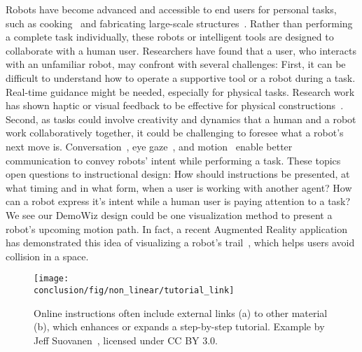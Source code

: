 Robots have become advanced and accessible to end users for personal tasks, such as cooking~\cite{Cha:2015:RHQ:2696454.2696465} and fabricating large-scale structures~\cite{Vasey:2016:HHR:2897839.2927404}. Rather than performing a complete task individually, these robots or intelligent tools are designed to collaborate with a human user. Researchers have found that a user, who interacts with an unfamiliar robot, may confront with several challenges:
%
First, it can be difficult to understand how to operate a supportive tool or a robot during a task. Real-time guidance might be needed, especially for physical tasks. Research work has shown haptic or visual feedback to be effective for physical constructions~\cite{Agrawal:2015:PPS:2807442.2807505,Zoran:2013:FFD:2470654.2481361,Schoop:2016:DSS:2851581.2892429}.
%
Second, as tasks could involve creativity and dynamics that a human and a robot work collaboratively together, it could be challenging to foresee what a robot's next move is. Conversation~\cite{ChaoSimonSays11}, eye gaze~\cite{Andrist:2014:CGA:2559636.2559666}, and motion~\cite{Dragan:2015:ERM:2696454.2696473,Szafir:2014:CIA:2559636.2559672} enable better communication to convey robots' intent while performing a task.
%
These topics open questions to instructional design:
How should instructions be presented, at what timing and in what form, when a user is working with another agent? How can a robot express it's intent while a human user is paying attention to a task?
%
We see our DemoWiz design could be one visualization method to present a robot's upcoming motion path. In fact, a recent Augmented Reality application has demonstrated this idea of visualizing a robot's trail~\cite{HoloLensRobot}, which helps users avoid collision in a space.

\begin{figure*}[ht!]
  \centering
  \texttt{[image: \\conclusion/fig/non\_linear/tutorial\_link]}
  \caption{
    Online instructions often include external links (a) to other material (b), which enhances or expands a step-by-step tutorial. Example by Jeff Suovanen~\cite{iPhoneRepairExample}, licensed under CC BY 3.0.
  }
  \label{fig:discussion_nonlinear}
\end{figure*}

